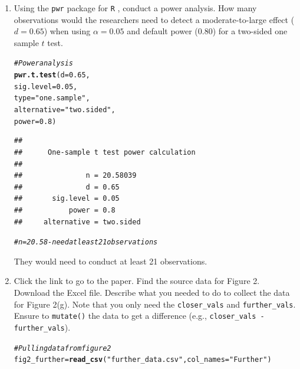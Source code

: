 \documentclass{article}\usepackage[]{graphicx}\usepackage[]{xcolor}
\makeatletter
\newcommand{\hlnum}[1]{\textcolor[rgb]{0.686,0.059,0.569}{#1}}%
\newcommand{\hlsng}[1]{\textcolor[rgb]{0.192,0.494,0.8}{#1}}%
\newcommand{\hlcom}[1]{\textcolor[rgb]{0.678,0.584,0.686}{\textit{#1}}}%
\newcommand{\hldef}[1]{\textcolor[rgb]{0.345,0.345,0.345}{#1}}%
\newcommand{\hlkwb}[1]{\textcolor[rgb]{0.69,0.353,0.396}{#1}}%
\newcommand{\hlkwc}[1]{\textcolor[rgb]{0.333,0.667,0.333}{#1}}%
\newcommand{\hlkwd}[1]{\textcolor[rgb]{0.737,0.353,0.396}{\textbf{#1}}}%
\newenvironment{kframe}{%
 \def\at@end@of@kframe{}%
 \ifinner\ifhmode%
  \def\at@end@of@kframe{\end{minipage}}%
  \begin{minipage}{\columnwidth}%
 \fi\fi%
 \def\FrameCommand##1{\hskip\@totalleftmargin \hskip-\fboxsep
 \colorbox{shadecolor}{##1}\hskip-\fboxsep
     \hskip-\linewidth \hskip-\@totalleftmargin \hskip\columnwidth}%
 \MakeFramed {\advance\hsize-\width
   \@totalleftmargin\z@ \linewidth\hsize
   \@setminipage}}%
 {\par\unskip\endMakeFramed%
 \at@end@of@kframe}
\newenvironment{knitrout}{}{} %
\makeatother
\begin{document}
\begin{enumerate}
\item Using the \texttt{pwr} package for \texttt{R} \citep{pwr},
conduct a power analysis. How many observations would the researchers 
need to detect a moderate-to-large effect ($d=0.65$) when using 
$\alpha=0.05$ and default power (0.80) for a two-sided one sample 
$t$ test.

\begin{knitrout}\scriptsize
{}\color{fgcolor}\begin{kframe}
\begin{alltt}
\hlcom{#Power analysis}
\hlkwd{pwr.t.test}\hldef{(}\hlkwc{d}\hldef{=}\hlnum{0.65}\hldef{,}
           \hlkwc{sig.level}\hldef{=}\hlnum{0.05}\hldef{,}
           \hlkwc{type}\hldef{=}\hlsng{"one.sample"}\hldef{,}
           \hlkwc{alternative} \hldef{=} \hlsng{"two.sided"}\hldef{,}
           \hlkwc{power}\hldef{=}\hlnum{0.8}\hldef{)}
\end{alltt}
\begin{verbatim}
## 
##      One-sample t test power calculation 
## 
##               n = 20.58039
##               d = 0.65
##       sig.level = 0.05
##           power = 0.8
##     alternative = two.sided
\end{verbatim}
\begin{alltt}
\hlcom{#n=20.58 - need at least 21 observations}
\end{alltt}
\end{kframe}
\end{knitrout}
 They would need to conduct at least 21 observations.

\item Click the link to go to the paper. Find the source data for 
Figure 2. Download the Excel file. Describe what you needed to
do to collect the data for Figure 2(g). Note that you only need the 
\texttt{closer\_vals} and \texttt{further\_vals}. Ensure to 
\texttt{mutate()} the data to get a difference 
(e.g., \texttt{closer\_vals - further\_vals}).

\begin{knitrout}\scriptsize
{}\color{fgcolor}\begin{kframe}
\begin{alltt}
\hlcom{#Pulling data from figure 2}
\hldef{fig2_further} \hlkwb{=} \hlkwd{read_csv}\hldef{(}\hlsng{"further_data.csv"}\hldef{,} \hlkwc{col_names} \hldef{=} \hlsng{"Further"}\hldef{)}
\end{alltt}



\end{kframe}
\end{knitrout}
\end{enumerate}
\end{document}
